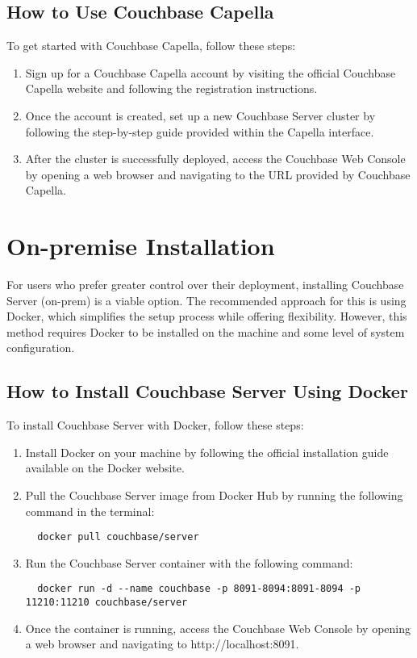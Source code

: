 \subsection{How to Use Couchbase Capella}
To get started with Couchbase Capella, follow these steps:

\begin{enumerate}
  \item Sign up for a Couchbase Capella account by visiting the official Couchbase Capella website and following the registration instructions. \cite{couchbaseCapellaSignUp}
  \item Once the account is created, set up a new Couchbase Server cluster by following the step-by-step guide provided within the Capella interface.
  \item After the cluster is successfully deployed, access the Couchbase Web Console by opening a web browser and navigating to the URL provided by Couchbase Capella.
\end{enumerate}

\section{On-premise Installation}
For users who prefer greater control over their deployment, installing Couchbase Server (on-prem) is a viable option. The recommended approach for this is using Docker, which simplifies the setup process while offering flexibility. However, this method requires Docker to be installed on the machine and some level of system configuration.

\subsection{How to Install Couchbase Server Using Docker}
To install Couchbase Server with Docker, follow these steps:

\begin{enumerate}
  \item Install Docker on your machine by following the official installation guide available on the Docker website.
  \item Pull the Couchbase Server image from Docker Hub by running the following command in the terminal:
  \begin{verbatim}
  docker pull couchbase/server
  \end{verbatim}
  \item Run the Couchbase Server container with the following command:
  \begin{verbatim}
  docker run -d --name couchbase -p 8091-8094:8091-8094 -p 11210:11210 couchbase/server
  \end{verbatim}
  \item Once the container is running, access the Couchbase Web Console by opening a web browser and navigating to http://localhost:8091.
\end{enumerate}


